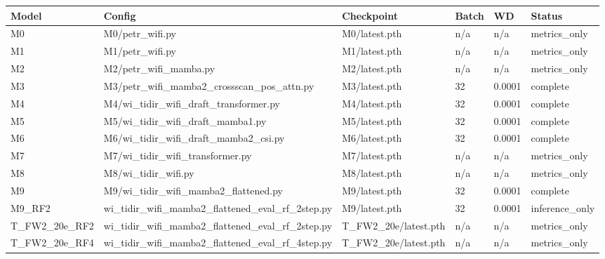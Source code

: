 \begin{tabular}{llllll}
\toprule
Model & Config & Checkpoint & Batch & WD & Status \\
\midrule
M0 & M0/petr\_wifi.py & M0/latest.pth & n/a & n/a & metrics\_only \\
M1 & M1/petr\_wifi.py & M1/latest.pth & n/a & n/a & metrics\_only \\
M2 & M2/petr\_wifi\_mamba.py & M2/latest.pth & n/a & n/a & metrics\_only \\
M3 & M3/petr\_wifi\_mamba2\_crossscan\_pos\_attn.py & M3/latest.pth & 32 & 0.0001 & complete \\
M4 & M4/wi\_tidir\_wifi\_draft\_transformer.py & M4/latest.pth & 32 & 0.0001 & complete \\
M5 & M5/wi\_tidir\_wifi\_draft\_mamba1.py & M5/latest.pth & 32 & 0.0001 & complete \\
M6 & M6/wi\_tidir\_wifi\_draft\_mamba2\_csi.py & M6/latest.pth & 32 & 0.0001 & complete \\
M7 & M7/wi\_tidir\_wifi\_transformer.py & M7/latest.pth & n/a & n/a & metrics\_only \\
M8 & M8/wi\_tidir\_wifi.py & M8/latest.pth & n/a & n/a & metrics\_only \\
M9 & M9/wi\_tidir\_wifi\_mamba2\_flattened.py & M9/latest.pth & 32 & 0.0001 & complete \\
M9\_RF2 & wi\_tidir\_wifi\_mamba2\_flattened\_eval\_rf\_2step.py & M9/latest.pth & 32 & 0.0001 & inference\_only \\
T\_FW2\_20e\_RF2 & wi\_tidir\_wifi\_mamba2\_flattened\_eval\_rf\_2step.py & T\_FW2\_20e/latest.pth & n/a & n/a & metrics\_only \\
T\_FW2\_20e\_RF4 & wi\_tidir\_wifi\_mamba2\_flattened\_eval\_rf\_4step.py & T\_FW2\_20e/latest.pth & n/a & n/a & metrics\_only \\
\bottomrule
\end{tabular}
